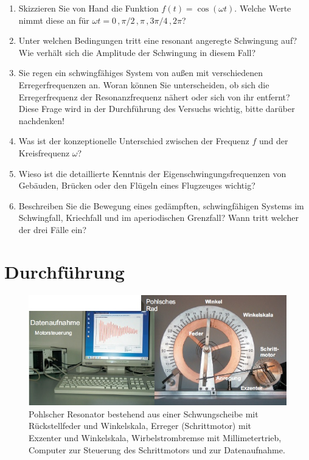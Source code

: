 \begin{enumerate} 
	\item Skizzieren Sie von Hand die Funktion $f(t) = \cos(\omega t)$. Welche Werte nimmt diese an für $\omega t = 0\, , \pi/2\, , \pi\, , 3\pi/4\, , 2\pi$?
	\item Unter welchen Bedingungen tritt eine resonant angeregte Schwingung auf? Wie verhält sich die Amplitude der Schwingung in diesem Fall?
	\item Sie regen ein schwingfähiges System von außen mit verschiedenen Erregerfrequenzen an. Woran können Sie unterscheiden, ob sich die Erregerfrequenz der Resonanzfrequenz nähert oder sich von ihr entfernt? Diese Frage wird in der Durchführung des Versuchs wichtig, bitte darüber nachdenken!
	\item Was ist der konzeptionelle Unterschied zwischen der Frequenz $f$ und der Kreisfrequenz $\omega$?
	\item Wieso ist die detaillierte Kenntnis der Eigenschwingungsfrequenzen von Gebäuden, Brücken oder den Flügeln eines Flugzeuges wichtig?
	\item Beschreiben Sie die Bewegung eines gedämpften, schwingfähigen Systems im Schwingfall, Kriechfall und im aperiodischen Grenzfall? Wann tritt welcher der drei Fälle ein?
\end{enumerate} 

\section{Durchführung} 

\begin{figure}[t]
	\centering
		\includegraphics[width=\textwidth]{Abbildungen/Pohl_AP.jpg}
	\caption{Pohlscher Resonator bestehend aus einer Schwungscheibe mit Rückstellfeder und Winkelskala, Erreger (Schrittmotor) mit Exzenter und Winkelskala, Wirbelstrombremse mit Millimetertrieb, Computer zur Steuerung des Schrittmotors und zur Datenaufnahme.}
	\label{fig:Pohl_AP}
\end{figure}


